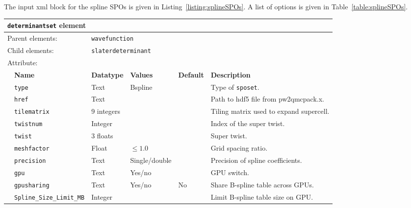 The input xml block for the spline SPOs is given in Listing~\ref{listing:splineSPOs}. A list of options is given in 
Table~\ref{table:splineSPOs}.

\begin{table}[h]
\begin{center}
\begin{tabularx}{\textwidth}{l l l l l X }
\hline
\multicolumn{6}{l}{\texttt{determinantset} element} \\
\hline
\multicolumn{2}{l}{Parent elements:} & \multicolumn{4}{l}{\texttt{wavefunction}}\\
\multicolumn{2}{l}{Child  elements:} & \multicolumn{4}{l}{\texttt{slaterdeterminant}}\\
\multicolumn{2}{l}{Attribute:} & \multicolumn{4}{l}{}\\
   &   \bfseries Name                   & \bfseries Datatype & \bfseries Values & \bfseries Default & \bfseries Description \\
   &   \texttt{type}                    &  Text              &   Bspline        &                   &  Type of \texttt{sposet}. \\
   &   \texttt{href}                    &  Text              &                  &                   &  Path to hdf5 file from pw2qmcpack.x. \\
   &   \texttt{tilematrix}              &  9 integers        &                  &                   &  Tiling matrix used to expand supercell. \\
   &   \texttt{twistnum}                &  Integer           &                  &                   &  Index of the super twist. \\
   &   \texttt{twist}                   &  3 floats          &                  &                   &  Super twist. \\
   &   \texttt{meshfactor}              &  Float             &  $\le 1.0$       &                   &  Grid spacing ratio. \\
   &   \texttt{precision}               &  Text              &  Single/double   &                   &  Precision of spline coefficients. \\
   &   \texttt{gpu}                     &  Text              &  Yes/no          &                   &  GPU switch. \\
   &   \texttt{gpusharing}              &  Text              &  Yes/no          & No                &  Share B-spline table across GPUs. \\
   &   \texttt{Spline\_Size\_Limit\_MB} &  Integer           &                  &                   &  Limit B-spline table size on GPU. \\

\end{tabularx}
\end{center}
\end{table}
